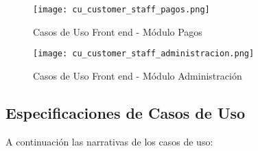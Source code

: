     \begin{figure}[H]
        \texttt{[image: cu\_customer\_staff\_pagos.png]}
        \caption{Casos de Uso Front end - Módulo Pagos}
        \label{fig:cu_customer_staff_pagos}
        \centering
    \end{figure}

    \begin{figure}[H]
        \texttt{[image: cu\_customer\_staff\_administracion.png]}
        \caption{Casos de Uso Front end - Módulo Administración}
        \label{fig:cu_customer_staff_administracion}
        \centering
    \end{figure}

    \subsection{Especificaciones de Casos de Uso}
    A continuación las narrativas de los casos de uso:

